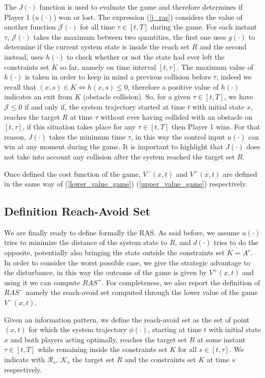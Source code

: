 The $J(\cdot)$ function is used to evaluate the game and therefore determines if Player 1 ($u(\cdot)$) won or lost. The expression (\ref{j_ras}) considers the value of another function $\mathcal{J}(\cdot)$ for all time $\tau \in [t, T]$ during the game. For each instant $\tau$, $\mathcal{J}(\cdot)$ takes the maximum between two quantities, the first one uses $g(\cdot)$ to determine if the current system state is inside the reach set $R$ and the second instead, uses $h(\cdot)$ to check whether or not the state had ever left the constraints set $K$ so far, namely on time interval $[t, \tau]$. The maximum value of $h(\cdot)$ is taken in order to keep in mind a previous collision before $\tau$, indeed we recall that $(x,s) \in K \Leftrightarrow h(x,s) \leq 0$, therefore a positive value of $h(\cdot)$ indicates an exit from $K$ (obstacle collision).
So, for a given $\tau \in [t, T]$, we have $\mathcal{J} \leq 0$ if and only if, the system trajectory started at time $t$ with initial state $x$, reaches the target $R$ at time $\tau$ without ever having collided with an obstacle on $[t, \tau]$, if this situation takes place for any $\tau \in [t, T]$ then Player 1 wins. For that reason, $J(\cdot)$ takes the minimum time $\tau$, in this way the control input $u(\cdot)$ can win at any moment during the game. It is important to highlight that $J(\cdot)$ does not take into account any collision after the system reached the target set $R$. 

Once defined the cost function of the game, $V^-(x,t)$ and $V^+(x,t)$ are defined in the same way of (\ref{lower_value_game}) (\ref{upper_value_game}) respectively.

\subsection{Definition Reach-Avoid Set}
We are finally ready to define formally the RAS. As said before, we assume $u(\cdot)$ tries to minimize the distance of the system state to $R$, and $d(\cdot)$ tries to do the opposite, potentially also bringing the state outside the constraints set $K=A^c$. In order to consider the worst possible case, we give the strategic advantage to the disturbance, in this way the outcome of the game is given by $V^+(x,t)$ and using it we can compute $RAS^+$. For completeness, we also report the definition of $RAS^-$ namely the reach-avoid set computed through the lower value of the game $V^-(x,t)$.

Given an information pattern, we define the reach-avoid set as the set of point $(x,t)$ for which the system trajectory $\phi(\cdot)$, starting at time $t$ with initial state $x$ and both players acting optimally, reaches the target set $R$ at some instant $\tau \in [t, T]$ while remaining inside the constraints set $K$ for all $s \in [t, \tau]$. We indicate with $\mathcal{R}_s$, $\mathcal{K}_s$ the target set $R$ and the constraints set $K$ at time $s$ respectively.

